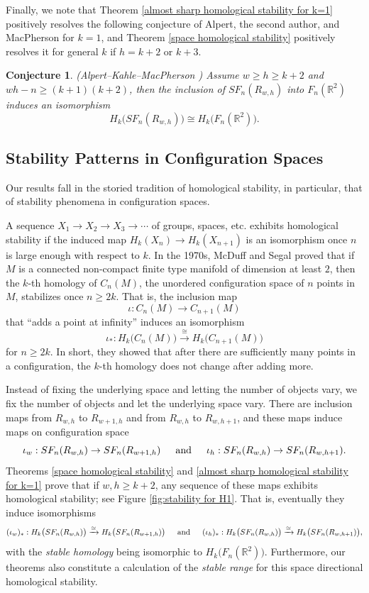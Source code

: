 \documentclass[pagebackref,colorlinks,citecolor=blue,linkcolor=blue,urlcolor=blue,filecolor=blue]{article}
\newtheorem{conj}[thm]{Conjecture}
\theoremstyle{definition}\newtheorem{definition}[thm]{Definition}
\theoremstyle{definition}
\newcommand{\R}{\ensuremath{\mathbb{R}}}
\begin{document}
Finally, we note that Theorem \ref{almost sharp homological stability for k=1} positively resolves the following conjecture of Alpert, the second author, and MacPherson  for $k=1$, and Theorem \ref{space homological stability} positively resolves it for general $k$ if $h=k+2$ or $k+3$.

\begin{conj}
(Alpert--Kahle--MacPherson \cite[Conjecture 6 ii]{alpert2023asymptotic})
Assume $w\ge h\ge k+2$ and $wh-n\ge (k+1)(k+2)$, then the inclusion of $SF_{n}(R_{w,h})$ into $F_{n}(\R^{2})$ induces an isomorphism
\[
H_{k}\big(SF_{n}(R_{w,h})\big)\cong H_{k}\big(F_{n}(\R^{2})\big).
\]
\end{conj}

\subsection{Stability Patterns in Configuration Spaces}\label{stability patterns}
Our results fall in the storied tradition of homological stability, in particular, that of stability phenomena in configuration spaces.


A sequence $X_{1}\to X_{2}\to X_{3}\to \cdots$ of groups, spaces, etc. exhibits homological stability if the induced map $H_{k}(X_{n})\to H_{k}(X_{n+1})$ is an isomorphism once $n$ is large enough with respect to $k$.
In the 1970s, McDuff \cite{mcduff1975configuration} and Segal \cite{segal1979topology} proved that if $M$ is a connected non-compact finite type manifold of dimension at least $2$, then the $k$-th homology of $C_{n}(M)$, the unordered configuration space of $n$ points in $M$, stabilizes once $n\ge 2k$.
That is, the inclusion map
\[
\iota:C_{n}(M)\to C_{n+1}(M)
\]
that ``adds a point at infinity'' induces an isomorphism
\[
\iota_{*}:H_{k}\big(C_{n}(M)\big)\xrightarrow{\cong} H_{k}\big(C_{n+1}(M)\big)
\]
for $n\ge 2k$.
In short, they showed that after there are sufficiently many points in a configuration, the $k$-th homology does not change after adding more.

Instead of fixing the underlying space and letting the number of objects vary, we fix the number of objects and let the underlying space vary.
There are inclusion maps from $R_{w,h}$ to $R_{w+1,h}$ and from $R_{w,h}$ to $R_{w,h+1}$, and these maps induce maps on configuration space
\[
\iota_{w}:SF_{n}(R_{w,h})\to SF_{n}(R_{w+1,h})\indent\text{and}\indent\iota_{h}:SF_{n}(R_{w,h})\to SF_{n}(R_{w,h+1}).
\]
Theorems \ref{space homological stability} and \ref{almost sharp homological stability for k=1} prove that if $w,h\ge k+2$, any sequence of these maps exhibits homological stability; see Figure \ref{fig:stability for H1}.
That is, eventually they induce isomorphisms 
\[
(\iota_{w})_{*}:H_{k}\big(SF_{n}(R_{w,h})\big)\xrightarrow{\cong} H_{k}\big(SF_{n}(R_{w+1,h})\big)\indent\text{and}\indent(\iota_{h})_{*}:H_{k}\big(SF_{n}(R_{w,h})\big)\xrightarrow{\cong} H_{k}\big(SF_{n}(R_{w,h+1})\big),
\]
with the \emph{stable homology} being isomorphic to $H_{k}\big(F_{n}(\R^{2})\big)$.
Furthermore, our theorems also constitute a calculation of the \emph{stable range} for this space directional homological stability.
\end{document}
